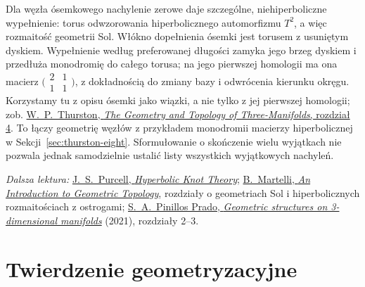 \begin{uwaga}
Dla węzła ósemkowego nachylenie zerowe daje
szczególne, niehiperboliczne wypełnienie: torus odwzorowania
hiperbolicznego automorfizmu $T^2$, a więc rozmaitość
geometrii Sol. Włókno dopełnienia ósemki jest torusem
z usuniętym dyskiem. Wypełnienie według preferowanej długości
zamyka jego brzeg dyskiem i przedłuża monodromię do całego torusa;
na jego pierwszej homologii ma ona macierz
$\bigl(\begin{smallmatrix}2&1\\1&1\end{smallmatrix}\bigr)$,
z dokładnością do zmiany bazy i odwrócenia kierunku okręgu.
Korzystamy tu z opisu ósemki jako wiązki, a nie tylko z jej
pierwszej homologii; zob.
\href{https://library.slmath.org/nonmsri/gt3m/PDF/Thurston-gt3m.pdf}
{W.\ P.\ Thurston, \emph{The Geometry and Topology of
Three-Manifolds}, rozdział 4}.
To łączy geometrię węzłów z przykładem
monodromii macierzy hiperbolicznej w Sekcji~\ref{sec:thurston-eight}.
Sformułowanie o skończenie wielu wyjątkach nie pozwala jednak
samodzielnie ustalić listy wszystkich wyjątkowych nachyleń.
\end{uwaga}

\par\smallskip
{\footnotesize\noindent\emph{Dalsza lektura:}
\href{https://users.monash.edu/~jpurcell/book/HypKnotTheory.pdf}
{J.~S.~Purcell, \emph{Hyperbolic Knot Theory}};
\href{https://people.dm.unipi.it/martelli/Geometric_topology.pdf}
{B.~Martelli, \emph{An Introduction to Geometric Topology}},
rozdziały o geometriach Sol i hiperbolicznych rozmaitościach
z ostrogami;
\href{https://www.mat.ufmg.br/posgrad/wp-content/uploads/TesesDissertacoes/Diss370.pdf}
{S.~A.~Pinillos Prado, \emph{Geometric structures on
3-dimensional manifolds}} (2021), rozdziały 2--3.\par}

\section{Twierdzenie geometryzacyjne}
\label{sec:thurston-theorem}

